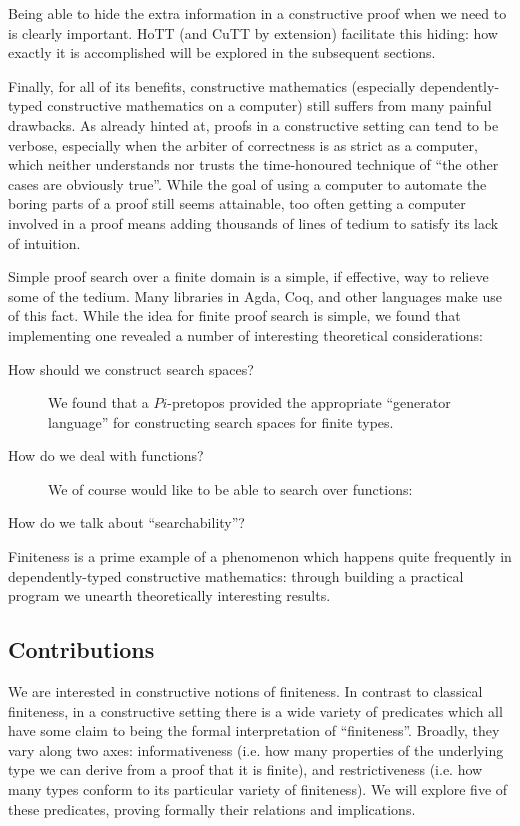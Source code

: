Being able to hide the extra information in a constructive proof when we need to
is clearly important.
HoTT (and CuTT by extension) facilitate this hiding: how exactly it is
accomplished will be explored in the subsequent sections.

Finally, for all of its benefits, constructive mathematics (especially
dependently-typed constructive mathematics on a computer) still suffers from
many painful drawbacks.
As already hinted at, proofs in a constructive setting can tend to be verbose,
especially when the arbiter of correctness is as strict as a computer, which
neither understands nor trusts the time-honoured technique of ``the other cases
are obviously true''.
While the goal of using a computer to automate the boring parts of a proof still
seems attainable, too often getting a computer involved in a proof means adding
thousands of lines of tedium to satisfy its lack of intuition.

Simple proof search over a finite domain is a simple, if effective, way to
relieve some of the tedium.
Many libraries in Agda, Coq, and other languages make use of this fact.
While the idea for finite proof search is simple, we found that implementing one
revealed a number of interesting theoretical considerations:
\begin{description}
  \item[How should we construct search spaces?]
    We found that a \(Pi\)-pretopos provided the appropriate ``generator
    language'' for constructing search spaces for finite types.
  \item[How do we deal with functions?]
    We of course would like to be able to search over functions: 
  \item[How do we talk about ``searchability''?]
\end{description}
Finiteness is a prime example of a phenomenon which happens quite frequently in
dependently-typed constructive mathematics: through building a practical program
we unearth theoretically interesting results.
\subsection{Contributions}
We are interested in constructive notions of finiteness.
In contrast to classical finiteness, in a constructive setting there is a wide
variety of predicates which all have some claim to being the formal
interpretation of ``finiteness''.
Broadly, they vary along two axes: informativeness (i.e. how many properties
of the underlying type we can derive from a proof that it is finite), and
restrictiveness (i.e. how many types conform to its particular variety of
finiteness).
We will explore five of these predicates, proving formally their relations and
implications.

